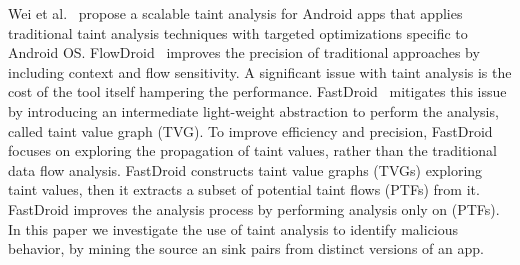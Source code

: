 Wei et al.~\cite{DBLP:conf/issta/HuangDMD15} propose a scalable taint analysis for Android apps that applies traditional taint analysis techniques with targeted optimizations specific to Android OS. FlowDroid~\cite{DBLP:conf/pldi/ArztRFBBKTOM14} improves the precision of traditional approaches by including context and flow sensitivity. A significant issue with taint analysis is the cost of the tool itself hampering the performance. FastDroid~\cite{DBLP:journals/compsec/ZhangTD21} mitigates this issue by introducing an intermediate light-weight abstraction to perform the analysis, called taint value graph (TVG). To improve efficiency and precision, FastDroid focuses on exploring the propagation of taint values, rather than the traditional data flow analysis. FastDroid constructs taint value graphs (TVGs) exploring taint values, then it extracts a subset of potential taint flows (PTFs) from it. FastDroid improves the analysis process by performing analysis only on (PTFs). In this paper we investigate the use of taint analysis to identify malicious behavior, by mining the source an sink pairs from distinct versions of an app.
